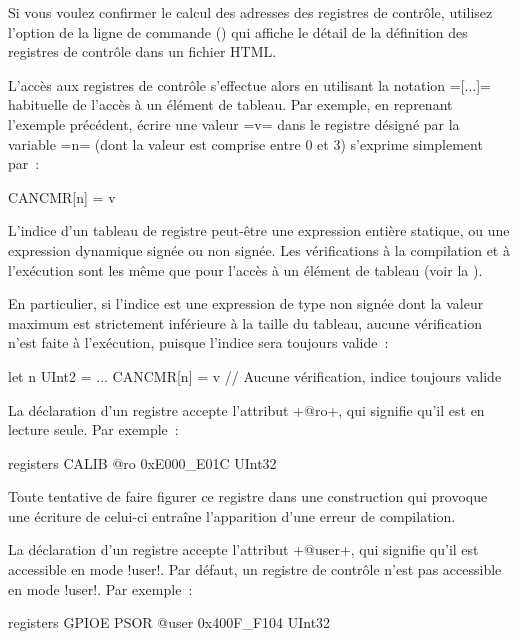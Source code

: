 Si vous voulez confirmer le calcul des adresses des registres de contrôle, utilisez l'option de la ligne de commande  () qui affiche le détail de la définition des registres de contrôle dans un fichier HTML.

L'accès aux registres de contrôle s'effectue alors en utilisant la notation \omnibus=[...]= habituelle de l'accès à un élément de tableau. Par exemple, en reprenant l'exemple précédent, écrire une valeur \omnibus=v= dans le registre désigné par la variable \omnibus=n= (dont la valeur est comprise entre $0$ et $3$) s'exprime simplement par~:

\begin{OMNIBUS}
CANCMR[n] = v
\end{OMNIBUS}

L'indice d'un tableau de registre peut-être une expression entière statique, ou une expression dynamique signée ou non signée. Les vérifications à la compilation et à l'exécution sont les même que pour l'accès à un élément de tableau (voir la ).

En particulier, si l'indice est une expression de type non signée dont la valeur maximum est strictement inférieure à la taille du tableau, aucune vérification n'est faite à l'exécution, puisque l'indice sera toujours valide~:

\begin{OMNIBUS}
let n UInt2 = ...
CANCMR[n] = v // Aucune vérification, indice toujours valide
\end{OMNIBUS}









La déclaration d'un registre accepte l'attribut \omnibus+@ro+, qui signifie qu'il est en lecture seule. Par exemple~:
\begin{OMNIBUS}
registers {
   CALIB @ro 0xE000_E01C UInt32
}
\end{OMNIBUS}

Toute tentative de faire figurer ce registre dans une construction qui provoque une écriture de celui-ci entraîne l'apparition d'une erreur de compilation.






La déclaration d'un registre accepte l'attribut \omnibus+@user+, qui signifie qu'il est accessible en mode \omnibus!user!. Par défaut, un registre de contrôle n'est pas accessible en mode  \omnibus!user!. Par exemple~:
\begin{OMNIBUS}
registers GPIOE {
  PSOR @user 0x400F_F104 UInt32
}
\end{OMNIBUS}

